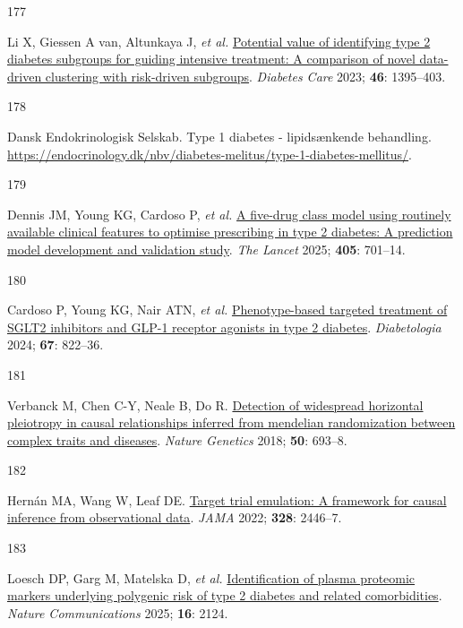 \documentclass[
  a4paper,
  headsepline=true,
  open=left]{scrbook}
\newlength{\cslhangindent}
\newlength{\csllabelwidth}
\newlength{\cslentryspacingunit} %
\newenvironment{CSLReferences}[2] %
 {%
  \setlength{\parindent}{0pt}
  \ifodd #1
  \let\oldpar\par
  \def\par{\hangindent=\cslhangindent\oldpar}
  \fi
  \setlength{\parskip}{#2\cslentryspacingunit}
 }%
 {}
\newcommand{\CSLLeftMargin}[1]{\parbox[t]{\csllabelwidth}{#1}}
\newcommand{\CSLRightInline}[1]{\parbox[t]{\linewidth - \csllabelwidth}{#1}\break}
\begin{document}
\begin{CSLReferences}{0}{0}
\leavevmode{}%
\CSLLeftMargin{177 }%
\CSLRightInline{Li X, Giessen A van, Altunkaya J, \emph{et al.}
\href{https://doi.org/10.2337/dc22-2170}{Potential value of identifying
type 2 diabetes subgroups for guiding intensive treatment: A comparison
of novel data-driven clustering with risk-driven subgroups}.
\emph{Diabetes Care} 2023; \textbf{46}: 1395--403.}

\leavevmode{}%
\CSLLeftMargin{178 }%
\CSLRightInline{Dansk Endokrinologisk Selskab. Type 1 diabetes -
lipidsænkende behandling.
\url{https://endocrinology.dk/nbv/diabetes-melitus/type-1-diabetes-mellitus/}.}

\leavevmode{}%
\CSLLeftMargin{179 }%
\CSLRightInline{Dennis JM, Young KG, Cardoso P, \emph{et al.}
\href{https://doi.org/10.1016/S0140-6736(24)02617-5}{A five-drug class
model using routinely available clinical features to optimise
prescribing in type 2 diabetes: A prediction model development and
validation study}. \emph{The Lancet} 2025; \textbf{405}: 701--14.}

\leavevmode{}%
\CSLLeftMargin{180 }%
\CSLRightInline{Cardoso P, Young KG, Nair ATN, \emph{et al.}
\href{https://doi.org/10.1007/s00125-024-06099-3}{Phenotype-based
targeted treatment of SGLT2 inhibitors and GLP-1 receptor agonists in
type 2 diabetes}. \emph{Diabetologia} 2024; \textbf{67}: 822--36.}

\leavevmode{}%
\CSLLeftMargin{181 }%
\CSLRightInline{Verbanck M, Chen C-Y, Neale B, Do R.
\href{https://doi.org/10.1038/s41588-018-0099-7}{Detection of widespread
horizontal pleiotropy in causal relationships inferred from mendelian
randomization between complex traits and diseases}. \emph{Nature
Genetics} 2018; \textbf{50}: 693--8.}

\leavevmode{}%
\CSLLeftMargin{182 }%
\CSLRightInline{Hernán MA, Wang W, Leaf DE.
\href{https://doi.org/10.1001/jama.2022.21383}{Target trial emulation: A
framework for causal inference from observational data}. \emph{JAMA}
2022; \textbf{328}: 2446--7.}

\leavevmode{}%
\CSLLeftMargin{183 }%
\CSLRightInline{Loesch DP, Garg M, Matelska D, \emph{et al.}
\href{https://doi.org/10.1038/s41467-025-56695-z}{Identification of
plasma proteomic markers underlying polygenic risk of type 2 diabetes
and related comorbidities}. \emph{Nature Communications} 2025;
\textbf{16}: 2124.}

\end{CSLReferences}
\end{document}
